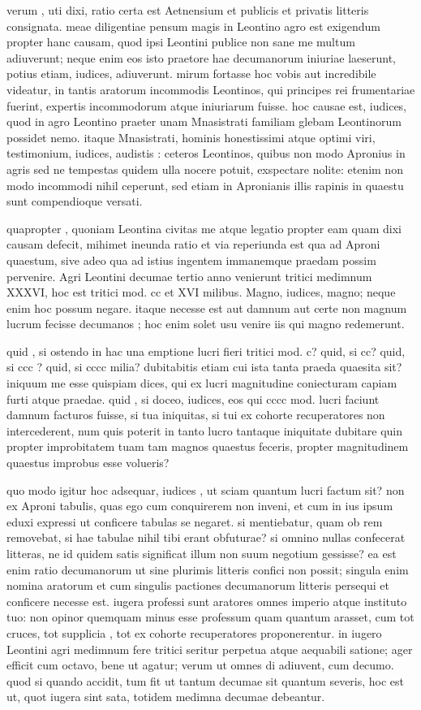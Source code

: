  verum , uti dixi, ratio certa est Aetnensium et publicis et privatis litteris consignata. meae diligentiae pensum magis in Leontino agro est exigendum propter hanc causam, quod ipsi Leontini publice non sane me multum adiuverunt; neque enim eos isto praetore hae decumanorum iniuriae laeserunt, potius etiam, iudices, adiuverunt. mirum fortasse hoc vobis aut incredibile videatur, in tantis aratorum incommodis Leontinos, qui principes rei frumentariae fuerint, expertis incommodorum atque iniuriarum fuisse. hoc causae est, iudices, quod in agro Leontino praeter unam Mnasistrati familiam glebam Leontinorum possidet nemo. itaque Mnasistrati, hominis honestissimi atque optimi viri, testimonium, iudices, audistis : ceteros Leontinos, quibus non modo Apronius in agris sed ne tempestas quidem ulla nocere potuit, exspectare nolite: etenim non modo incommodi nihil ceperunt, sed etiam in Apronianis illis rapinis in quaestu sunt compendioque versati.

 quapropter , quoniam Leontina civitas me atque legatio propter eam quam dixi causam defecit, mihimet ineunda ratio et via reperiunda est qua ad Aproni quaestum, sive adeo qua ad istius ingentem immanemque praedam possim pervenire. Agri Leontini decumae tertio anno venierunt tritici medimnum XXXVI, hoc est tritici mod. cc et XVI milibus. Magno, iudices, magno; neque enim hoc possum negare. itaque necesse est aut damnum aut certe non magnum lucrum fecisse decumanos ; hoc enim solet usu venire iis qui magno redemerunt.

 quid , si ostendo in hac una emptione lucri fieri tritici mod. c? quid, si cc? quid, si ccc ? quid, si cccc milia? dubitabitis etiam cui ista tanta praeda quaesita sit? iniquum me esse quispiam dices, qui ex lucri magnitudine coniecturam capiam furti atque praedae. quid , si doceo, iudices, eos qui cccc mod. lucri faciunt damnum facturos fuisse, si tua iniquitas, si tui ex cohorte recuperatores non intercederent, num quis poterit in tanto lucro tantaque iniquitate dubitare quin propter improbitatem tuam tam magnos quaestus feceris, propter magnitudinem quaestus improbus esse volueris?

 quo modo igitur hoc adsequar, iudices , ut sciam quantum lucri factum sit? non ex Aproni tabulis, quas ego cum conquirerem non inveni, et cum in ius ipsum eduxi expressi ut conficere tabulas se negaret. si mentiebatur, quam ob rem removebat, si hae tabulae nihil tibi erant obfuturae? si omnino nullas confecerat litteras, ne id quidem satis significat illum non suum negotium gessisse? ea est enim ratio decumanorum ut sine plurimis litteris confici non possit; singula enim nomina aratorum et cum singulis pactiones decumanorum litteris persequi et conficere necesse est. iugera professi sunt aratores omnes imperio atque instituto tuo: non opinor quemquam minus esse professum quam quantum arasset, cum tot cruces, tot supplicia , tot ex cohorte recuperatores proponerentur. in iugero Leontini agri medimnum fere tritici seritur perpetua atque aequabili satione; ager efficit cum octavo, bene ut agatur; verum ut omnes di adiuvent, cum decumo. quod si quando accidit, tum fit ut tantum decumae sit quantum severis, hoc est ut, quot iugera sint sata, totidem medimna decumae debeantur.

